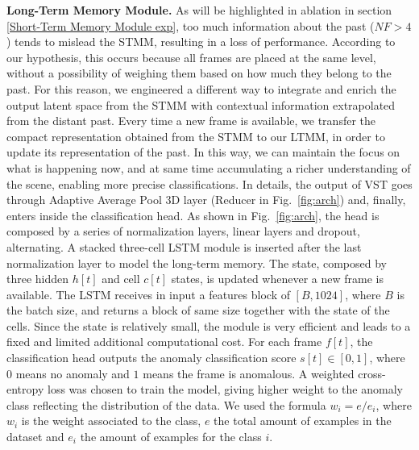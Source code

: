 \noindent\textbf{Long-Term Memory Module.}
\label{Long-Term Memory Module descr}
As will be highlighted in ablation in section \ref{Short-Term Memory Module exp}, too much information about the past ($\mathit{NF} > 4$) tends to mislead the STMM, resulting in a loss of performance.
According to our hypothesis, this occurs because all frames are placed at the same level, without a possibility of weighing them based on how much they belong to the past.
For this reason, we engineered a different way to integrate and enrich the output latent space from the STMM with contextual information extrapolated from the distant past.
Every time a new frame is available, we transfer the compact representation obtained from the STMM to our LTMM, in order to update its representation of the past.
In this way, we can maintain the focus on what is happening now, and at same time accumulating a richer understanding of the scene, enabling more precise classifications.
In details, the output of VST goes through Adaptive Average Pool 3D layer (Reducer in Fig.~\ref{fig:arch}) and, finally, enters inside the classification head.
As shown in Fig.~\ref{fig:arch}, the head is composed by a series of normalization layers, linear layers and dropout, alternating. 
A stacked three-cell LSTM module is inserted after the last normalization layer to model the long-term memory.
The state, composed by three hidden $h[t]$ and cell $c[t]$ states, is updated whenever a new frame is available.
The LSTM receives in input a features block of $[B, 1024]$, where $B$ is the batch size, and returns a block of same size together with the state of the cells.
Since the state is relatively small, the module is very efficient and leads to a fixed and limited additional computational cost.
For each frame $f[t]$, the classification head outputs the anomaly classification score $s[t] \in [0,1]$, where $0$ means no anomaly and $1$ means the frame is anomalous.
A weighted cross-entropy loss was chosen to train the model, giving higher weight to the anomaly class reflecting the distribution of the data.
We used the formula $w_i = e / e_i$, where $w_i$ is the weight associated to the class, $e$ the total amount of examples in the dataset and $e_i$ the amount of examples for the class $i$.

